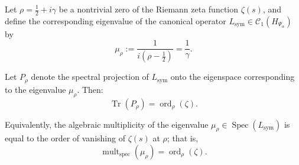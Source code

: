 \begin{lemma}
\label{lem:spectral_multiplicity_matching}
Let \( \rho = \tfrac{1}{2} + i\gamma \) be a nontrivial zero of the Riemann zeta function \( \zeta(s) \), and define the corresponding eigenvalue of the canonical operator \( L_{\mathrm{sym}} \in \mathcal{C}_1(H_{\Psi_\alpha}) \) by
\[
\mu_\rho := \frac{1}{i(\rho - \tfrac{1}{2})} = \frac{1}{\gamma}.
\]

Let \( P_\rho \) denote the spectral projection of \( L_{\mathrm{sym}} \) onto the eigenspace corresponding to the eigenvalue \( \mu_\rho \). Then:
\[
\operatorname{Tr}(P_\rho) = \operatorname{ord}_\rho(\zeta).
\]

Equivalently, the algebraic multiplicity of the eigenvalue \( \mu_\rho \in \operatorname{Spec}(L_{\mathrm{sym}}) \) is equal to the order of vanishing of \( \zeta(s) \) at \( \rho \); that is,
\[
\operatorname{mult}_{\mathrm{spec}}(\mu_\rho) = \operatorname{ord}_\rho(\zeta).
\]
\end{lemma}
